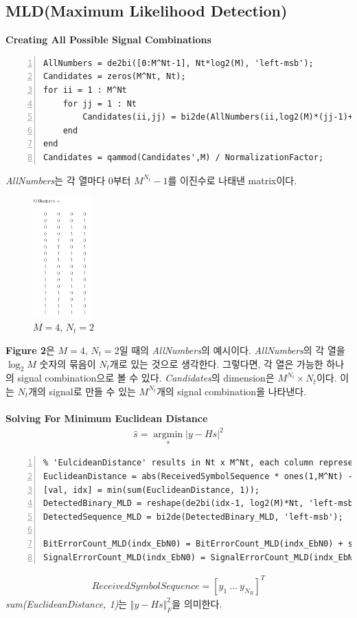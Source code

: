 \documentclass{article}
\newcommand{\bd}{\textbf} %
\providecommand{\abs}[1]{\lvert#1\rvert}
\begin{document}
\subsection{MLD(Maximum Likelihood Detection)}
\bd{Creating All Possible Signal Combinations}
\begin{lstlisting}[style=Matlab-editor, frame=single, numbers=left,]
% Creating Matrix for all possible combinations of signals (M^Nt possible combinations)
AllNumbers = de2bi([0:M^Nt-1], Nt*log2(M), 'left-msb');
Candidates = zeros(M^Nt, Nt);
for ii = 1 : M^Nt
    for jj = 1 : Nt
        Candidates(ii,jj) = bi2de(AllNumbers(ii,log2(M)*(jj-1)+1:log2(M)*jj), 'left-msb');
    end
end
Candidates = qammod(Candidates',M) / NormalizationFactor;
\end{lstlisting}
\textsl{AllNumbers}는 각 열마다 0부터 $M^{N_t}-1$를 이진수로 나태낸 matrix이다.
\begin{figure}[H]
	\centerline{\includegraphics[width=0.2\textwidth]{AllNumbers.png}}
	\caption{$M=4$, $N_t=2$}
\end{figure}
\bd{Figure 2}은 $M=4$, $N_t=2$일 때의 \textsl{AllNumbers}의 예시이다. \textsl{AllNumbers}의 각 열을 $\log_{2}M$ 숫자의 묶음이 $N_t$개로 있는 것으로 생각한다. 그렇다면, 각 열은 가능한 하나의 signal combination으로 볼 수 있다. \textsl{Candidates}의 dimension은 $M^{N_t}\times N_t$이다. 이는 $N_t$개의 signal로 만들 수 있는 $M^{N_t}$개의 signal combination을 나타낸다.\\
\\
\bd{Solving For Minimum Euclidean Distance}
\begin{gather}
\hat{s}=\operatorname*{argmin}_s \abs{y-Hs}^2
\end{gather}
\begin{lstlisting}[style=Matlab-editor, frame=single, numbers=left,]
% MLD Receiver
% 'EulcideanDistance' results in Nt x M^Nt, each column representing each candidate symbol combination
EuclideanDistance = abs(ReceivedSymbolSequence * ones(1,M^Nt) - H*Candidates).^2;
[val, idx] = min(sum(EuclideanDistance, 1));
DetectedBinary_MLD = reshape(de2bi(idx-1, log2(M)*Nt, 'left-msb'),log2(M),[])';
DetectedSequence_MLD = bi2de(DetectedBinary_MLD, 'left-msb');

BitErrorCount_MLD(indx_EbN0) = BitErrorCount_MLD(indx_EbN0) + sum(SignalBinary~=DetectedBinary_MLD, 'all');
SignalErrorCount_MLD(indx_EbN0) = SignalErrorCount_MLD(indx_EbN0) + sum(SignalSequence~=DetectedSequence_MLD, 'all');
\end{lstlisting}
\begin{gather}
ReceivedSymbolSequence=[y_1\ \hdots\ y_{N_R}]^T
\end{gather}
\textsl{sum(EuclideanDistance, 1)}는 $\Vert y-Hs\Vert_F^2$을 의미한다.
\end{document}
